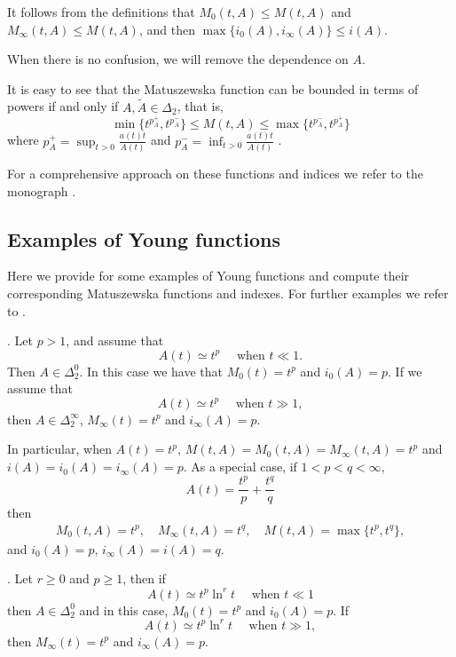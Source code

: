 \documentclass[12pt,reqno]{amsart}
\theoremstyle{definition}
\theoremstyle{remark}
\numberwithin{equation}{section}
\begin{document}
It follows from the definitions that $M_0(t,A)\leq M(t,A)$ and $M_\infty(t,A)\leq M(t,A)$, and then $\max\{i_0(A), i_\infty(A)\} \leq i(A)$.

When there is no confusion, we will remove the dependence on $A$.


It is easy to see that the Matuszewska function can be bounded in terms of powers if and only if $A,\tilde A\in \Delta_2$, that is,  
\begin{equation} \label{cota.M}
	\min\{ t^{p^+_A},t^{p^-_A}\}\leq M(t,A)  \leq \max\{t^{p^-_A},t^{p^+_A} \}
\end{equation}
where $p^+_A = \sup_{t>0} \frac{a(t)t}{A(t)}$ and $p^-_A = \inf_{t>0} \frac{a(t)t}{A(t)}$ .

For a comprehensive approach on these functions and indices we refer to the monograph \cite{M89}.



\subsection{Examples of Young functions} \label{ejemplos}

Here we provide for some examples of Young functions and compute their corresponding Matuszewska functions and indexes. For further examples we refer to \cite{M89}.



\medskip

. Let $p>1$, and assume that 
$$
A(t) \simeq t^p \quad \text{ when } t\ll1.
$$
Then $A\in \Delta_2^0$. In this case we have that $M_0(t)=t^p$ and $i_0(A)=p$. If we assume that
$$
A(t)\simeq t^p \quad \text{ when } t\gg1,
$$
then $A\in \Delta_2^\infty$, $M_\infty(t)=t^p$ and $i_\infty(A)=p$.

\noindent In particular, when $A(t)=t^p$, $M(t,A)=M_0(t,A)=M_\infty(t,A)=t^p$ and $i(A)=i_0(A)=i_\infty(A)=p$.
As a special case, if $1<p<q<\infty$, 
$$
A(t)=\frac{t^p}{p} + \frac{t^q}{q}
$$ 
then 
\begin{align*}
M_0(t,A)=t^{p}, \quad M_\infty(t,A)= t^q, \quad M(t,A)=\max\{t^p, t^q\},
\end{align*}
and $i_0(A)=p$, $i_\infty(A)=i(A)=q$.

\medskip

. Let $r\geq 0$ and $p\geq 1$, then if 
$$
A(t)\simeq t^p \ln^r t \quad \text{ when } t\ll1
$$
then $A\in \Delta_2^0$ and in this case, $M_0(t) = t^{p}$ and $i_0(A)=p$. If  
$$
A(t)\simeq t^p \ln^r t \quad \text{ when } t\gg1, 
$$
then $M_\infty(t)=t^p$ and $i_\infty(A)=p$.
\end{document}
